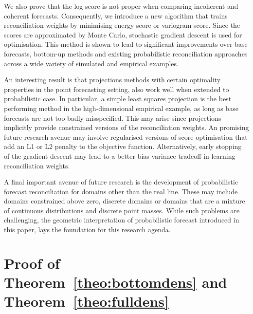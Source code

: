 \documentclass[11pt]{article}
\theoremstyle{definition}
\begin{document}
We also prove that the log score is not proper when comparing incoherent and coherent forecasts. Consequently, we introduce a new algorithm that trains reconciliation weights by minimising energy score or variogram score. Since the scores are approximated by Monte Carlo, stochastic gradient descent is used for optimisation. This method is shown to lead to significant improvements over base forecasts, bottom-up methods and existing probabilistic reconciliation approaches across a wide variety of simulated and empirical examples.

An interesting result is that projections methods with certain optimality properties in the point forecasting setting, also work well when extended to probabilistic case. In particular, a simple least squares projection is the best performing method in the high-dimensional empirical example, as long as base forecasts are not too badly misspecified. This may arise since projections implicitly provide constrained versions of the reconciliation weights. An promising future research avenue may involve regularised versions of score optimisation that add an L1 or L2 penalty to the objective function. Alternatively, early stopping \citep{BuhYu2003,YaoEtAl2007} of the gradient descent may lead to a better bias-variance tradeoff in learning reconciliation weights.

A final important avenue of future research is the development of probabilistic forecast reconciliation for domains other than the real line. These may include domains constrained above zero, discrete domains or domains that are a mixture of continuous distributions and discrete point masses. While such problems are challenging, the geometric interpretation of probabilistic forecast introduced in this paper, lays the foundation for this research agenda.

\newpage

\appendix

\section{Proof of Theorem~\ref{theo:bottomdens} and Theorem~\ref{theo:fulldens}} \label{app:Bottom&FullDens}
\end{document}
